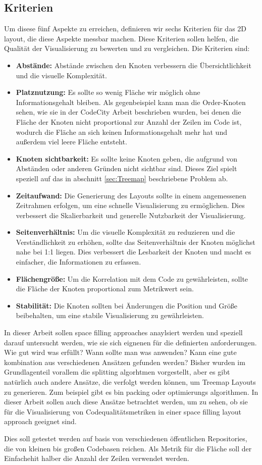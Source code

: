 \subsection{Kriterien} \label{sec:ZielKriterien}
Um disese fünf Aspekte zu erreichen, definieren wir sechs Kriterien für das 2D layout, die diese Aspekte messbar machen. Diese Kriterien sollen helfen, die Qualität der Visualisierung zu bewerten und zu vergleichen. Die Kriterien sind:

\begin{itemize}
    \item \textbf{Abstände:} Abstände zwischen den Knoten verbessern die Übersichtlichkeit und die visuelle Komplexität.
    \item \textbf{Platznutzung:} Es sollte so wenig Fläche wir möglich ohne Informationsgehalt bleiben. Als gegenbeispiel kann man die Order-Knoten sehen, wie sie in der CodeCity Arbeit beschrieben wurden, bei denen die Fläche der Knoten nicht proportional zur Anzahl der Zeilen im Code ist, wodurch die Fläche an sich keinen Informationsgehalt mehr hat und außerdem viel leere Fläche entsteht.
    \item \textbf{Knoten sichtbarkeit:} Es sollte keine Knoten geben, die aufgrund von Abständen oder anderen Gründen nicht sichtbar sind. Dieses Ziel spielt speziell auf das in abschnitt \ref{sec:Treemap} beschriebene Problem ab.
    \item \textbf{Zeitaufwand:} Die Generierung des Layouts sollte in einem angemessenen Zeitrahmen erfolgen, um eine schnelle Visualisierung zu ermöglichen. Dies verbessert die Skalierbarkeit und generelle Nutzbarkeit der Visualisierung.
    \item \textbf{Seitenverhältnis:} Um die visuelle Komplexität zu reduzieren und die Verständlichkeit zu erhöhen, sollte das Seitenverhältnis der Knoten möglichst nahe bei 1:1 liegen. Dies verbessert die Lesbarkeit der Knoten und macht es einfacher, die Informationen zu erfassen.
    \item \textbf{Flächengröße:} Um die Korrelation mit dem Code zu gewährleisten, sollte die Fläche der Knoten proportional zum Metrikwert sein.
    \item \textbf{Stabilität:} Die Knoten sollten bei Änderungen die Position und Größe beibehalten, um eine stabile Visualisierung zu gewährleisten. 
\end{itemize}

In dieser Arbeit sollen space filling approaches anaylsiert werden und speziell darauf untersucht werden, wie sie sich eignenen für die definierten anforderungen. Wie gut wird was erfüllt? Wann sollte man was anwenden? Kann eine gute kombination aus verschiedenen Ansätzen gefunden werden?
Bisher wurden im Grundlagenteil vorallem die splitting algorhtmen vorgestellt, aber es gibt natürlich auch andere Ansätze, die verfolgt werden können, um Treemap Layouts zu generieren. Zum beispiel gibt es bin packing oder optimierungs algorithmen. In dieser Arbeit sollen auch diese Ansätze betrachtet werden, um zu sehen, ob sie für die Visualisierung von Codequalitätsmetriken in einer space filling layout approach geeignet sind.

Dies soll getestet werden auf basis von verschiedenen öffentlichen Repositories, die von kleinen bis großen Codebasen reichen. Als Metrik für die Fläche soll der Einfachehit halber die Anzahl der Zeilen verwendet werden.

